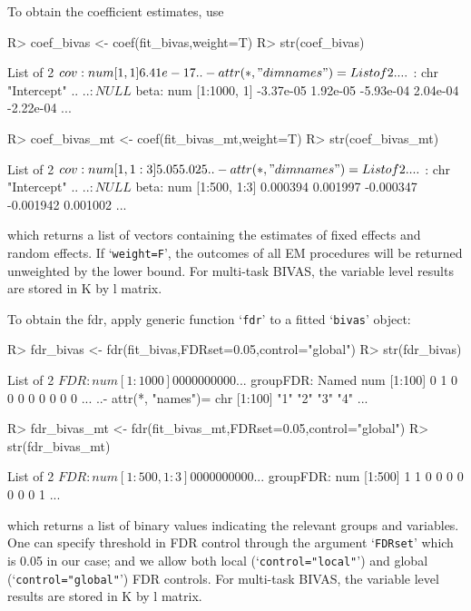 \documentclass[11pt]{article}
\begin{document}
To obtain the coefficient estimates, use
\begin{Schunk}
\begin{Sinput}
R> coef_bivas <- coef(fit_bivas,weight=T)
R> str(coef_bivas)
\end{Sinput}
\begin{Soutput}
List of 2
 $ cov : num [1, 1] 6.41e-17
  ..- attr(*, "dimnames")=List of 2
  .. ..$ : chr "Intercept"
  .. ..$ : NULL
 $ beta: num [1:1000, 1] -3.37e-05 1.92e-05 -5.93e-04 2.04e-04 -2.22e-04 ...
\end{Soutput}
\begin{Sinput}
R> coef_bivas_mt <- coef(fit_bivas_mt,weight=T)
R> str(coef_bivas_mt)
\end{Sinput}
\begin{Soutput}
List of 2
 $ cov : num [1, 1:3] 5.05 5.02 5
  ..- attr(*, "dimnames")=List of 2
  .. ..$ : chr "Intercept"
  .. ..$ : NULL
 $ beta: num [1:500, 1:3] 0.000394 0.001997 -0.000347 -0.001942 0.001002 ...
\end{Soutput}
\end{Schunk}
which returns a list of vectors containing the estimates of fixed effects and random effects. If `\texttt{weight=F}', the outcomes of all EM procedures will be returned unweighted by the lower bound. For multi-task BIVAS, the variable level results are stored in K by l matrix.

To obtain the fdr, apply generic function `\texttt{fdr}' to a fitted `\texttt{bivas}' object:
\begin{Schunk}
\begin{Sinput}
R> fdr_bivas <- fdr(fit_bivas,FDRset=0.05,control="global")
R> str(fdr_bivas)
\end{Sinput}
\begin{Soutput}
List of 2
 $ FDR     : num [1:1000] 0 0 0 0 0 0 0 0 0 0 ...
 $ groupFDR: Named num [1:100] 0 1 0 0 0 0 0 0 0 0 ...
  ..- attr(*, "names")= chr [1:100] "1" "2" "3" "4" ...
\end{Soutput}
\begin{Sinput}
R> fdr_bivas_mt <- fdr(fit_bivas_mt,FDRset=0.05,control="global")
R> str(fdr_bivas_mt)
\end{Sinput}
\begin{Soutput}
List of 2
 $ FDR     : num [1:500, 1:3] 0 0 0 0 0 0 0 0 0 0 ...
 $ groupFDR: num [1:500] 1 1 0 0 0 0 0 0 0 1 ...
\end{Soutput}
\end{Schunk}
which returns a list of binary values indicating the relevant groups and variables. One can specify threshold in FDR control through the argument `\texttt{FDRset}' which is 0.05 in our case; and we allow both local (`\texttt{control="local"}') and global (`\texttt{control="global"}') FDR controls. For multi-task BIVAS, the variable level results are stored in K by l matrix.
\end{document}
